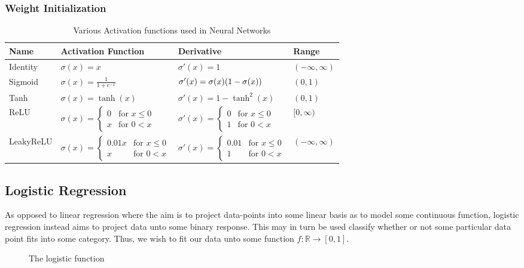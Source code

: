 \documentclass[reprint, english, nofootinbib]{revtex4-2}
\begin{document}
\subsubsection{Weight Initialization}


\begin{table}[]
\caption{\label{tab: activation functions}Various Activation functions used in Neural Networks}
\setlength{\tabcolsep}{20pt}
\renewcommand{\arraystretch}{2.5}
\begin{tabular}{llll}
    Name & Activation Function & Derivative & Range \\
    \hline\hline
    Identity &
    $\sigma(x) = x$  &
    $\sigma'(x) = 1$ &
    $(-\infty, \infty)$
    \\ \hline
    Sigmoid &
    $\sigma(x) = \frac{1}{1 + e^{-x}}$  &
    $\sigma'(x) =\sigma(x)\qty(1-\sigma(x))$ &
    $(0, 1)$
    \\ \hline
    Tanh &
    $\sigma(x) = \tanh(x)$  &
    $\sigma'(x) =  1 - \tanh^2(x)$ &
    $(0, 1)$
    \\ \hline
    ReLU    &
    $\sigma(x) = \left\{\begin{matrix}0 & \text{for } x \leq 0 \\ x & \text{for } 0 < x\end{matrix}\right.$ &
    $\sigma'(x) = \left\{\begin{matrix}0 & \text{for } x \leq 0 \\ 1 & \text{for } 0 < x\end{matrix}\right.$ &
    $[0, \infty)$
    \\ \hline
    LeakyReLU &
    $\sigma(x) = \left\{\begin{matrix}0.01x & \text{for } x \leq 0 \\ x & \text{for } 0 < x\end{matrix}\right.$ &
    $\sigma'(x) = \left\{\begin{matrix}0.01 & \text{for } x \leq 0 \\ 1 & \text{for } 0 < x\end{matrix}\right.$ &
    $(-\infty, \infty)$
    \\ \hline
\end{tabular}
\end{table}



\subsection{Logistic Regression}
\noindent
As opposed to linear regression where the aim is to project data-points into some linear basis as to model some continuous function, logistic regression instead aims to project data unto some binary response. This may in turn be used classify whether or not some particular data point fits into some category. Thus, we wish to fit our data unto some function $f : \mathbb R \rightarrow [0, 1]$.
\begin{figure}[h!tb]
    \center
    
    \caption{The logistic function}
\end{figure}
\end{document}
